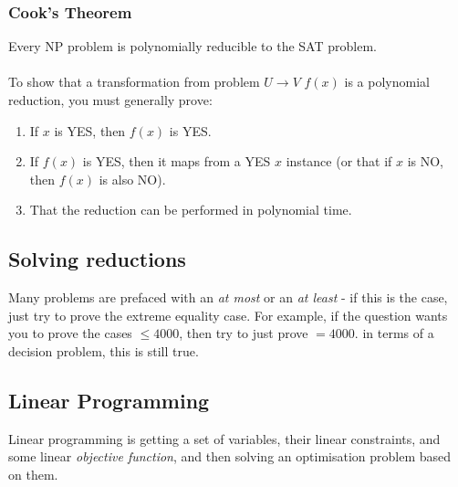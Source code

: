 \documentclass[journal, letterpaper]{IEEEtran}
\begin{document}
  \subsubsection{Cook's Theorem} Every NP problem is polynomially reducible to the SAT problem. \\ \\
  To show that a transformation from problem $U \to V$ $f(x)$ is a polynomial reduction, you must generally prove:
  \begin{enumerate}
    \item If $x$ is YES, then $f(x)$ is YES.
    \item If $f(x)$ is YES, then it maps from a YES $x$ instance (or that if $x$ is NO, then $f(x)$ is also NO).
    \item That the reduction can be performed in polynomial time.
  \end{enumerate}
  \subsection{Solving reductions}
   Many problems are prefaced with an \emph{at most} or an \emph{at least} - if this is the case, just try to prove
      the extreme equality case. For example, if the question wants you to prove the cases $\le 4000$, then try to just prove 
      $= 4000$. in terms of a decision problem, this is still true.
  \subsection{Linear Programming}
  Linear programming is getting a set of variables, their linear constraints, and some linear \emph{objective function}, and
  then solving an optimisation problem based on them. \vspace{-0.4cm}
\end{document}
